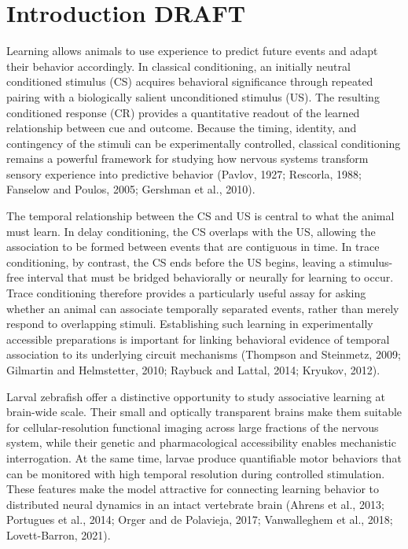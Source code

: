 \section{Introduction DRAFT}

Learning allows animals to use experience to predict future events and adapt their behavior accordingly. In classical conditioning, an initially neutral conditioned stimulus (CS) acquires behavioral significance through repeated pairing with a biologically salient unconditioned stimulus (US). The resulting conditioned response (CR) provides a quantitative readout of the learned relationship between cue and outcome. Because the timing, identity, and contingency of the stimuli can be experimentally controlled, classical conditioning remains a powerful framework for studying how nervous systems transform sensory experience into predictive behavior (Pavlov, 1927; Rescorla, 1988; Fanselow and Poulos, 2005; Gershman et al., 2010).

The temporal relationship between the CS and US is central to what the animal must learn. In delay conditioning, the CS overlaps with the US, allowing the association to be formed between events that are contiguous in time. In trace conditioning, by contrast, the CS ends before the US begins, leaving a stimulus-free interval that must be bridged behaviorally or neurally for learning to occur. Trace conditioning therefore provides a particularly useful assay for asking whether an animal can associate temporally separated events, rather than merely respond to overlapping stimuli. Establishing such learning in experimentally accessible preparations is important for linking behavioral evidence of temporal association to its underlying circuit mechanisms (Thompson and Steinmetz, 2009; Gilmartin and Helmstetter, 2010; Raybuck and Lattal, 2014; Kryukov, 2012).

Larval zebrafish offer a distinctive opportunity to study associative learning at brain-wide scale. Their small and optically transparent brains make them suitable for cellular-resolution functional imaging across large fractions of the nervous system, while their genetic and pharmacological accessibility enables mechanistic interrogation. At the same time, larvae produce quantifiable motor behaviors that can be monitored with high temporal resolution during controlled stimulation. These features make the model attractive for connecting learning behavior to distributed neural dynamics in an intact vertebrate brain (Ahrens et al., 2013; Portugues et al., 2014; Orger and de Polavieja, 2017; Vanwalleghem et al., 2018; Lovett-Barron, 2021).

